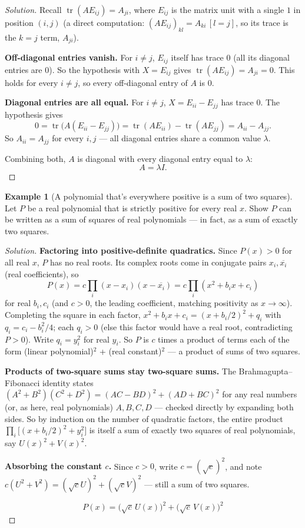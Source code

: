 \documentclass[11pt]{article}
\theoremstyle{definition}
\newtheorem{example}{Example}[section]
\newcommand{\trace}{\operatorname{tr}}
\begin{document}
\begin{proof}[Solution]
Recall $\trace(AE_{ij})=A_{ji}$, where $E_{ij}$ is the matrix unit with a single $1$ in position $(i,j)$ (a direct computation: $(AE_{ij})_{kl}=A_{ki}\,[l=j]$, so its trace is the $k=j$ term, $A_{ji}$).

\textbf{Off-diagonal entries vanish.} For $i\neq j$, $E_{ij}$ itself has trace $0$ (all its diagonal entries are $0$). So the hypothesis with $X=E_{ij}$ gives $\trace(AE_{ij})=A_{ji}=0$. This holds for every $i\neq j$, so every off-diagonal entry of $A$ is $0$.

\textbf{Diagonal entries are all equal.} For $i\neq j$, $X=E_{ii}-E_{jj}$ has trace $0$. The hypothesis gives
\[
0=\trace\big(A(E_{ii}-E_{jj})\big)=\trace(AE_{ii})-\trace(AE_{jj})=A_{ii}-A_{jj}.
\]
So $A_{ii}=A_{jj}$ for every $i,j$ — all diagonal entries share a common value $\lambda$.

Combining both, $A$ is diagonal with every diagonal entry equal to $\lambda$:
\[
\boxed{A=\lambda I}.
\]
\end{proof}

\begin{example}[A polynomial that's everywhere positive is a sum of two squares]
Let $P$ be a real polynomial that is strictly positive for every real $x$. Show $P$ can be written as a sum of squares of real polynomials — in fact, as a sum of exactly two squares.
\end{example}
\begin{proof}[Solution]
\textbf{Factoring into positive-definite quadratics.} Since $P(x)>0$ for all real $x$, $P$ has no real roots. Its complex roots come in conjugate pairs $x_i,\overline{x_i}$ (real coefficients), so
\[
P(x)=c\prod_i(x-x_i)(x-\overline{x_i})=c\prod_i(x^2+b_ix+c_i)
\]
for real $b_i,c_i$ (and $c>0$, the leading coefficient, matching positivity as $x\to\infty$). Completing the square in each factor, $x^2+b_ix+c_i=(x+b_i/2)^2+q_i$ with $q_i=c_i-b_i^2/4$; each $q_i>0$ (else this factor would have a real root, contradicting $P>0$). Write $q_i=y_i^2$ for real $y_i$. So $P$ is $c$ times a product of terms each of the form (linear polynomial)$^2$ + (real constant)$^2$ — a product of sums of two squares.

\textbf{Products of two-square sums stay two-square sums.} The Brahmagupta–Fibonacci identity states $(A^2+B^2)(C^2+D^2)=(AC-BD)^2+(AD+BC)^2$ for any real numbers (or, as here, real polynomials) $A,B,C,D$ — checked directly by expanding both sides. So by induction on the number of quadratic factors, the entire product $\prod_i\bigl[(x+b_i/2)^2+y_i^2\bigr]$ is itself a sum of exactly two squares of real polynomials, say $U(x)^2+V(x)^2$.

\textbf{Absorbing the constant $c$.} Since $c>0$, write $c=(\sqrt c)^2$, and note $c(U^2+V^2)=(\sqrt cU)^2+(\sqrt cV)^2$ — still a sum of two squares.

\[
\boxed{P(x)=\bigl(\sqrt c\,U(x)\bigr)^2+\bigl(\sqrt c\,V(x)\bigr)^2}
\]
\end{proof}
\end{document}
